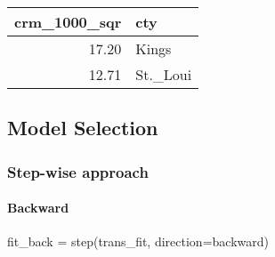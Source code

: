 \documentclass[
]{article}
\newenvironment{Shaded}{\begin{snugshade}}{\end{snugshade}}
\newcommand{\AttributeTok}[1]{\textcolor[rgb]{0.77,0.63,0.00}{#1}}
\newcommand{\FunctionTok}[1]{\textcolor[rgb]{0.00,0.00,0.00}{#1}}
\newcommand{\NormalTok}[1]{#1}
\newcommand{\OtherTok}[1]{\textcolor[rgb]{0.56,0.35,0.01}{#1}}
\newcommand{\StringTok}[1]{\textcolor[rgb]{0.31,0.60,0.02}{#1}}
\begin{document}
\begin{longtable}[]{@{}rl@{}}
\toprule
crm\_1000\_sqr & cty \\
\midrule
\endhead
17.20 & Kings \\
12.71 & St.\_Loui \\
\bottomrule
\end{longtable}

\hypertarget{model-selection}{%
\subsection{Model Selection}\label{model-selection}}

\hypertarget{step-wise-approach}{%
\subsubsection{Step-wise approach}\label{step-wise-approach}}

\hypertarget{backward}{%
\paragraph{Backward}\label{backward}}

\begin{Shaded}
\begin{Highlighting}[]
\NormalTok{fit\_back }\OtherTok{=} \FunctionTok{step}\NormalTok{(trans\_fit, }\AttributeTok{direction=}\StringTok{\textquotesingle{}backward\textquotesingle{}}\NormalTok{)}
\end{Highlighting}
\end{Shaded}
\end{document}
